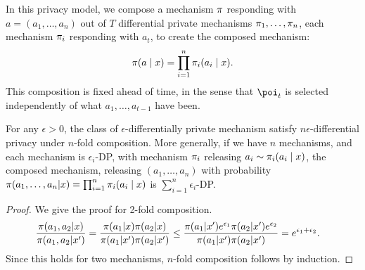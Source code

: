 \begin{frame}
  \begin{definition}
    In this privacy model, we compose a mechanism $\pi$ responding with $a = (a_1, \ldots, a_n)$ out of $T$ differential private mechanisms $\pi_1, \ldots, \pi_n$, each mechanism $\pi_i$ responding with $a_t$, to create the composed mechanism:
    \[
      \pi(a \mid x) = \prod_{i=1}^n \pi_i(a_i \mid x).
    \]
    This composition is fixed ahead of time, in the sense that $\poi_t$ is selected independently of what $a_1, \ldots, a_{t-1}$ have been.
  \end{definition}
  \begin{theorem}
    For any $\epsilon > 0$, the class of $\epsilon$-differentially private mechanism satisfy $n \epsilon$-differential privacy under $n$-fold composition. More generally, if we have $n$ mechanisms, and each mechanism is $\epsilon_i$-DP, with mechanism $\pi_i$ releasing $a_i \sim \pi_i(a_i \mid x)$, the composed mechanism, releasing $(a_1, \ldots, a_n)$ with probability $\pi(a_1, \ldots, a_n | x) = \prod_{i=1}^n \pi_i(a_i \mid x)$  is $\sum_{i=1}^n \epsilon_i$-DP.
  \end{theorem}
  \begin{proof}
    We give the proof for 2-fold composition.
    \begin{align*}
      \frac{\pi(a_1, a_2 | x)}{\pi(a_1, a_2 | x')}
      &=
        \frac{\pi(a_1 | x) \pi(a_2 | x)}{\pi(a_1 | x') \pi(a_2 | x')}
      \leq
        \frac{\pi(a_1 | x') e^{\epsilon_1} \pi(a_2 | x') e^{\epsilon_2}}{\pi(a_1 | x') \pi(a_2 | x')}
      =
        e^{\epsilon_1 + \epsilon_2}.
    \end{align*}
    Since this holds for two mechanisms, $n$-fold composition follows by induction.
   \end{proof}
\end{frame}
